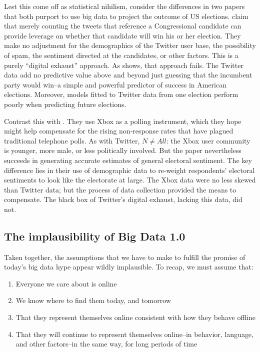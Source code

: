 \documentclass[12pt]{article}
\begin{document}
Lest this come off as statistical nihilism, consider the differences
in two papers that both purport to use big data to project the outcome
of US elections. \cite{digrazia2013} claim that merely counting the
tweets that reference a Congressional candidate can provide leverage
on whether that candidate will win his or her election. They make no
adjustment for the demographics of the Twitter user base, the
possibility of spam, the sentiment directed at the candidates, or
other factors. This is a purely ``digital exhaust'' approach. As
\cite{huberty2013twitter} shows, that approach fails. The Twitter data
add no predictive value above and beyond just guessing that the
incumbent party would win--a simple and powerful predictor of success
in American elections. Moreover, models fitted to Twitter data from
one election perform poorly when predicting future elections.

Contrast this with \cite{gelman2013}. They use Xbox as a polling
instrument, which they hope might help compensate for the rising
non-response rates that have plagued traditional telephone polls. As
with Twitter, $N \neq All$: the Xbox user community is younger, more
male, or less politically involved. But the paper nevertheless
succeeds in generating accurate estimates of general electoral
sentiment. The key difference lies in their use of demographic data to
re-weight respondents' electoral sentiments to look like the
electorate at large. The Xbox data were no less skewed than Twitter
data; but the process of data collection provided the means to
compensate. The black box of Twitter's digital exhaust, lacking this
data, did not.



\subsection{The implausibility of Big Data 1.0}
\label{sec:impl-big-data}


Taken together, the assumptions that we have to make to fulfill the
promise of today's big data hype appear wildly implausible. To recap,
we must assume that:

\begin{enumerate}
\item Everyone we care about is online
\item We know where to find
  them today, and tomorrow
\item That they represent themselves online
  consistent with how they behave offline
\item That they will continue
  to represent themselves online--in behavior, language, and other
  factors--in the same way, for long periods of time
\end{enumerate}
\end{document}
